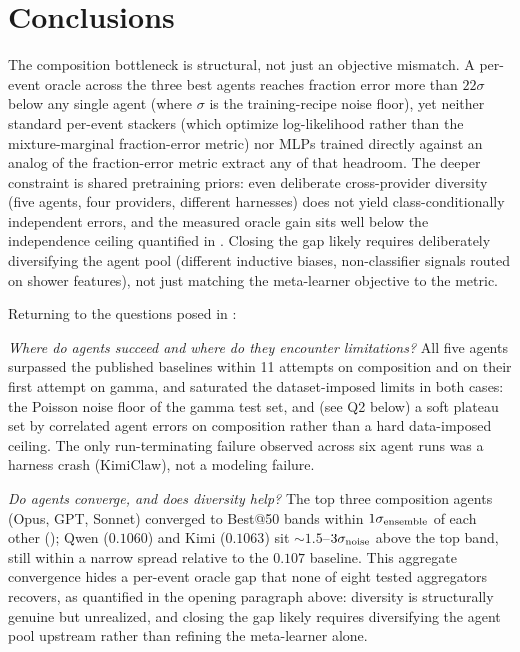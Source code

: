 \documentclass[universe,article,submit,pdftex,oneauthor]{Definitions/mdpi}
\begin{document}
\section{Conclusions}
\label{sec:conclusion}

The composition bottleneck is structural, not just an objective mismatch. A per-event oracle across the three best agents reaches fraction error more than $22\sigma$ below any single agent (where $\sigma$ is the training-recipe noise floor), yet neither standard per-event stackers (which optimize log-likelihood rather than the mixture-marginal fraction-error metric) nor MLPs trained directly against an analog of the fraction-error metric extract any of that headroom. The deeper constraint is shared pretraining priors: even deliberate cross-provider diversity (five agents, four providers, different harnesses) does not yield class-conditionally independent errors, and the measured oracle gain sits well below the independence ceiling quantified in . Closing the gap likely requires deliberately diversifying the agent pool (different inductive biases, non-classifier signals routed on shower features), not just matching the meta-learner objective to the metric.

Returning to the questions posed in :

\textit{Where do agents succeed and where do they encounter limitations?} All five agents surpassed the published baselines within 11 attempts on composition and on their first attempt on gamma, and saturated the dataset-imposed limits in both cases: the Poisson noise floor of the gamma test set, and (see Q2 below) a soft plateau set by correlated agent errors on composition rather than a hard data-imposed ceiling. The only run-terminating failure observed across six agent runs was a harness crash (KimiClaw), not a modeling failure.

\textit{Do agents converge, and does diversity help?} The top three composition agents (Opus, GPT, Sonnet) converged to Best@50 bands within $1\sigma_{\rm ensemble}$ of each other (); Qwen ($0.1060$) and Kimi ($0.1063$) sit ${\sim}1.5$--$3\sigma_{\rm noise}$ above the top band, still within a narrow spread relative to the $0.107$ baseline. This aggregate convergence hides a per-event oracle gap that none of eight tested aggregators recovers, as quantified in the opening paragraph above: diversity is structurally genuine but unrealized, and closing the gap likely requires diversifying the agent pool upstream rather than refining the meta-learner alone.
\end{document}
